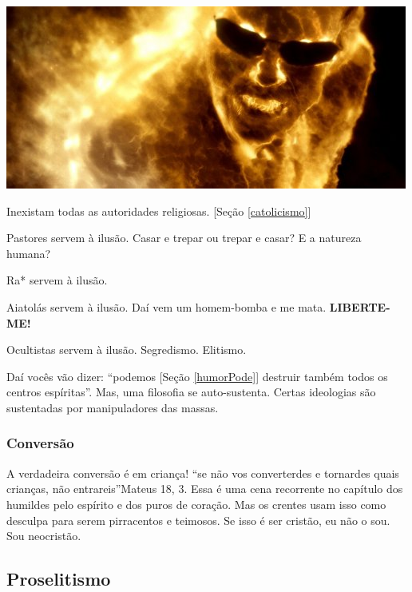 \documentclass[12pt,a4paper]{article}
\begin{document}
			\begin{center}
			\includegraphics{matrix}
			\end{center}

			Inexistam todas as autoridades religiosas. [Se\c{c}\~ao \ref{catolicismo}]

			Pastores servem \`a ilus\~ao. Casar e trepar ou trepar e casar? E a natureza\cite{natureza} humana?

			Ra* servem \`a ilus\~ao.

			Aiatol\'as servem \`a ilus\~ao. Da\'i vem um homem-bomba e me mata. \textbf{LIBERTE-ME!}

			Ocultistas servem \`a ilus\~ao. Segredismo. Elitismo.

			Da\'i voc\^es v\~ao dizer: \textquotedblleft podemos [Se\c{c}\~ao \ref{humorPode}] destruir tamb\'em todos os centros esp\'iritas\textquotedblright. Mas, uma filosofia se auto-sustenta. Certas ideologias s\~ao sustentadas por manipuladores das massas.

			\subsubsection{Convers\~ao}
			\begin{flushright}
			\end{flushright}

			A verdadeira convers\~ao \'e em crian\c{c}a! \textquotedblleft se n\~ao vos converterdes e tornardes quais crian\c{c}as, n\~ao entrareis\textquotedblright Mateus 18, 3. Essa \'e uma cena recorrente no cap\'itulo dos humildes pelo esp\'irito e dos puros de cora\c{c}\~ao. Mas os crentes usam isso como desculpa para serem pirracentos e teimosos. Se isso \'e ser crist\~ao, eu n\~ao o sou. Sou neocrist\~ao.

		\subsection{Proselitismo}
			\begin{flushright}
			\end{flushright}
\end{document}
